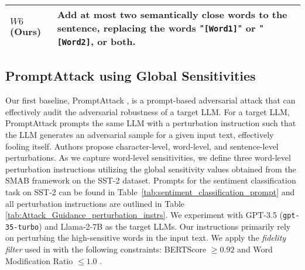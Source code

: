 \begin{table*}[t!]
{\begin{tabular}{l | l }
    \midrule
    $W6$ (Ours) &      Add at most two semantically close words to the sentence, replacing the words "\texttt{[Word1]}" or "\texttt{[Word2]}, or both.\\
    \bottomrule
\end{tabular}%
}
\caption{Perturbation instructions used in Prompt Guidance: In \textit{$W4$}, \textit{$W5$} and \textit{$W6$}, \texttt{[Word1]} is replaced with the most sensitive word in the sentence, while \texttt{[Word2]} is replaced with the second most sensitive word. In \textit{$W4$}, \texttt{GS1} and \texttt{GS2} represent the global sensitivity values of the most sensitive word and the second most sensitive word. 
}
\label{tab:Attack_Guidance_perturbation_instrs}
\end{table*}

\subsection{PromptAttack using Global Sensitivities}
Our first baseline, PromptAttack \cite{xu2023llmfoolitselfpromptbased}, is a prompt-based adversarial attack that can effectively audit the adversarial robustness of a target LLM. For a target LLM, PromptAttack prompts the same LLM with a perturbation instruction such that the LLM generates an adversarial sample for a given input text, effectively fooling itself. Authors propose character-level, word-level, and sentence-level perturbations. As we capture word-level sensitivities, we define three word-level perturbation instructions utilizing the global sensitivity values obtained from the SMAB framework on the SST-2 dataset. Prompts for the sentiment classification task on SST-2 can be found in Table~\ref{tab:sentiment_classification_prompt} and all perturbation instructions are outlined in Table \ref{tab:Attack_Guidance_perturbation_instrs}. We experiment with GPT-3.5 (\texttt{gpt-35-turbo}) and Llama-2-7B as the target LLMs. Our instructions primarily rely on perturbing the high-sensitive words in the input text. We apply the \textit{fidelity filter} used in \citet{xu2023llmfoolitselfpromptbased} with the following constraints: BERTScore $\geq 0.92$ \cite{zhang2019bertscore} and Word Modification Ratio $\le 1.0$ \cite{wang-etal-2018-glue}.\\
